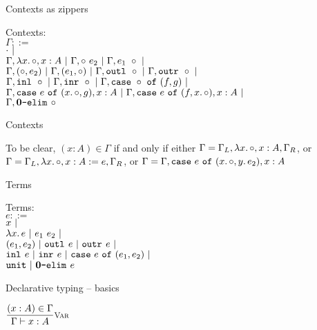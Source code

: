 \documentclass{beamer}
\begin{document}
\begin{frame}{Contexts as zippers}

Contexts: \\
$\Gamma ::=$ \\
\qquad $\cdot \ |\ $ \\
\qquad $\extendfun{\Gamma}{x}{A} \pipe \extendappl{\Gamma}{e_2} \pipe \extendappr{\Gamma}{e_1} \pipe$ \\
\qquad $\Gamma, (\circ, e_2) \ |\  \Gamma, (e_1, \circ) \ |\  \Gamma, \texttt{outl}_{}\ \circ \ |\  \Gamma, \texttt{outr}_{}\ \circ \ |\ $ \\
\qquad $\Gamma, \texttt{inl}_{}\ \circ \ |\  \Gamma, \texttt{inr}_{}\ \circ \ |\  \Gamma, \texttt{case}\ \circ\ \texttt{of}\ (f, g) \ |\ $ \\
\qquad $\extendcasel{\Gamma}{e}{x}{A}{g} \pipe \extendcaser{\Gamma}{e}{f}{x}{A} \pipe$ \\
\qquad $\Gamma, \textbf{0}\texttt{-elim}_{}\ \circ$

\end{frame}

\begin{frame}{Contexts}

To be clear, $(x : A) \in \Gamma$ if and only if either $\Gamma = \extendfun{\Gamma_L}{x}{A}, \Gamma_R$, or $\Gamma = \extendfun{\Gamma_L}{x}{A}[e], \Gamma_R$, or $\Gamma = \extendcasel{\Gamma}{e}{x}{A}{y.\, e_2}$

\end{frame}

\begin{frame}{Terms}

Terms: \\
$e ::=$ \\
\qquad $x \ |\ $ \\
\qquad $\fun{x}{e} \pipe \app{e_1}{e_2} \pipe$ \\
\qquad $(e_1, e_2) \ |\  \texttt{outl}_{}\ e \ |\  \texttt{outr}_{}\ e \ |\ $ \\
\qquad $\texttt{inl}_{}\ e \ |\  \texttt{inr}_{}\ e \ |\  \texttt{case}\ e\ \texttt{of}\ (e_1, e_2) \ |\ $ \\
\qquad $\texttt{unit} \ |\  \textbf{0}\texttt{-elim}_{}\ e$

\end{frame}

\begin{frame}{Declarative typing -- basics}

\begin{center}
  $\infrule[Var]{\sidecond{(x : A) \in \Gamma}}{\typing{x}{A}}$
\end{center}

\end{frame}
\end{document}
